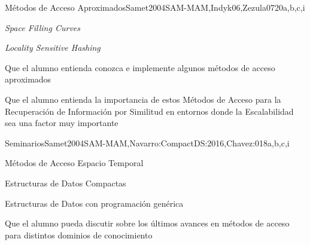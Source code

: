 \begin{syllabus}
\begin{unit}{Métodos de Acceso Aproximados}{Samet2004SAM-MAM,Indyk06,Zezula07}{20}{a,b,c,i}
   \begin{topics}
         \item \textit{Space Filling Curves}
         \item \textit{Locality Sensitive Hashing}
   \end{topics}

   \begin{unitgoals}
         \item Que el alumno entienda conozca e implemente algunos métodos de acceso aproximados
         \item Que el alumno entienda la importancia de estos Métodos de Acceso para la Recuperación de Información por Similitud en entornos donde la Escalabilidad sea una factor muy importante
   \end{unitgoals}
\end{unit}

\begin{unit}{Seminarios}{Samet2004SAM-MAM,Navarro:CompactDS:2016,Chavez:01}{8}{a,b,c,i}
	\begin{topics}
         \item Métodos de Acceso Espacio Temporal
         \item Estructuras de Datos Compactas
         \item Estructuras de Datos con programación genérica
   \end{topics}

   \begin{unitgoals}
         \item Que el alumno pueda discutir sobre los últimos avances en métodos de acceso para distintos dominios de conocimiento
   \end{unitgoals}
\end{unit}



\begin{coursebibliography}
\end{coursebibliography}

\end{syllabus}
